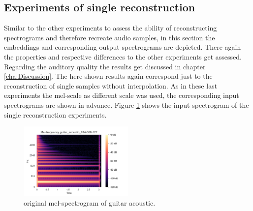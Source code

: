 \subsection{Experiments of single reconstruction}
Similar to the other experiments to assess the ability of reconstructing spectrograms and therefore recreate audio samples, in this section the embeddings and corresponding output spectrograms are depicted. There again the properties and respective differences to the other experiments get assessed. Regarding the auditory quality the results get discussed in chapter \ref{cha:Discussion}. The here shown results again correspond just to the reconstruction of single samples without interpolation. As in these last experiments the mel-scale as different scale was used, the corresponding input spectrograms are shown in advance. Figure \ref{fig:res_2D_mel_guit} shows the input spectrogram of the single reconstruction experiments.

\begin{figure}[htb!]
    \centering
    \includegraphics[width=0.5\textwidth]{images/results/mel_guitar_acoustic_014-060-127.png}
    \caption{original mel-spectrogram of guitar acoustic.}
    \label{fig:res_2D_mel_guit}
\end{figure}



